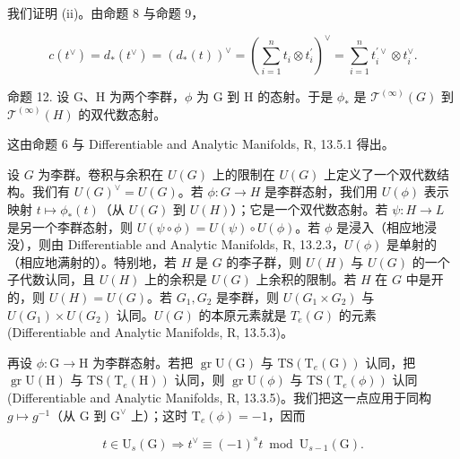 我们证明 (ii)。由命题 8 与命题 9，

\[
c (t ^ {\vee}) = d _ {*} (t ^ {\vee}) = (d _ {*} (t)) ^ {\vee} = \left(\sum_ {i = 1} ^ {n} t _ {i} \otimes t _ {i} ^ {\prime}\right) ^ {\vee} = \sum_ {i = 1} ^ {n} t _ {i} ^ {\prime \vee} \otimes t _ {i} ^ {\vee}.
\]

命题 12. 设 G、H 为两个李群，\(\phi\) 为 G 到 H 的态射。于是 \(\phi_{*}\) 是 \(\mathcal{T}^{(\infty)}(G)\) 到 \(\mathcal{T}^{(\infty)}(H)\) 的双代数态射。

这由命题 6 与 Differentiable and Analytic Manifolds, R, 13.5.1 得出。

设 \(G\) 为李群。卷积与余积在 \(U(G)\) 上的限制在 \(U(G)\) 上定义了一个双代数结构。我们有 \(U(G)^{\vee} = U(G)\)。若 \(\phi: G \to H\) 是李群态射，我们用 \(U(\phi)\) 表示映射 \(t \mapsto \phi_{*}(t)\)（从 \(U(G)\) 到 \(U(H)\)）；它是一个双代数态射。若 \(\psi: H \to L\) 是另一个李群态射，则 \(U(\psi \circ \phi) = U(\psi) \circ U(\phi)\)。若 \(\phi\) 是浸入（相应地浸没），则由 Differentiable and Analytic Manifolds, R, 13.2.3，\(U(\phi)\) 是单射的（相应地满射的）。特别地，若 \(H\) 是 \(G\) 的李子群，则 \(U(H)\) 与 \(U(G)\) 的一个子代数认同，且 \(U(H)\) 上的余积是 \(U(G)\) 上余积的限制。若 \(H\) 在 \(G\) 中是开的，则 \(U(H) = U(G)\)。若 \(G_1, G_2\) 是李群，则 \(U(G_1 \times G_2)\) 与 \(U(G_1) \times U(G_2)\) 认同。\(U(G)\) 的本原元素就是 \(T_e(G)\) 的元素 (Differentiable and Analytic Manifolds, R, 13.5.3)。

再设 \(\phi: \mathrm{G} \to \mathrm{H}\) 为李群态射。若把 \(\operatorname{gr} \mathrm{U}(\mathrm{G})\) 与 \(\mathrm{TS}(\mathrm{T}_e(\mathrm{G}))\) 认同，把 \(\operatorname{gr} \mathrm{U}(\mathrm{H})\) 与 \(\mathrm{TS}(\mathrm{T}_e(\mathrm{H}))\) 认同，则 \(\operatorname{gr} \mathrm{U}(\phi)\) 与 \(\mathrm{TS}(\mathrm{T}_e(\phi))\) 认同 (Differentiable and Analytic Manifolds, R, 13.3.5)。我们把这一点应用于同构 \(g \mapsto g^{-1}\)（从 \(\mathrm{G}\) 到 \(\mathrm{G}^{\vee}\) 上）；这时 \(\mathrm{T}_e(\phi) = -1\)，因而

\[
t \in \mathrm{U} _ {s} (\mathrm{G}) \Rightarrow t ^ {\vee} \equiv (- 1) ^ {s} t \bmod \mathrm{U} _ {s - 1} (\mathrm{G}).\tag{3}
\]

